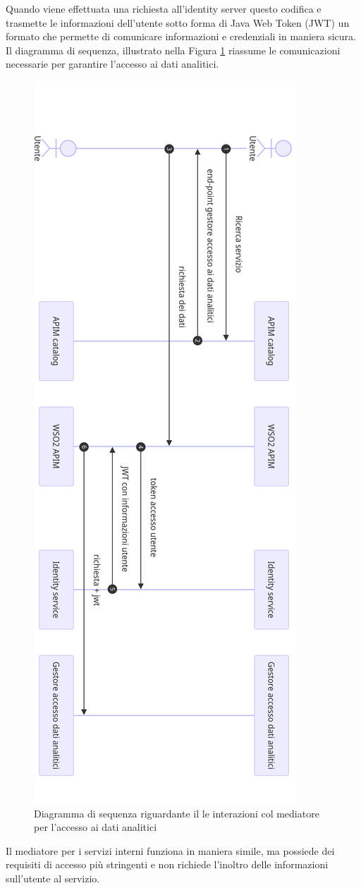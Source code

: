 \documentclass[12pt]{report}
\begin{document}
Quando viene effettuata una richiesta all'identity server questo codifica e trasmette le informazioni dell'utente sotto forma di Java Web Token (JWT) \cite{jwt_documentation} un formato che permette di comunicare informazioni e credenziali in maniera sicura.
Il diagramma di sequenza, illustrato nella Figura \ref{funzionamento mediatore} riassume le comunicazioni necessarie per garantire l'accesso ai dati analitici.
\begin{figure}[H]
    \centering
    \includegraphics[width = 0.53\linewidth]{immagini/Funzionamento mediatore dati analitci.png}
    \caption{Diagramma di sequenza riguardante il le interazioni col mediatore per l'accesso ai dati analitici}
    \label{funzionamento mediatore}
\end{figure}
Il mediatore per i servizi interni funziona in maniera simile, ma possiede dei requisiti di accesso più stringenti e non richiede l'inoltro delle informazioni sull'utente al servizio.
\end{document}
